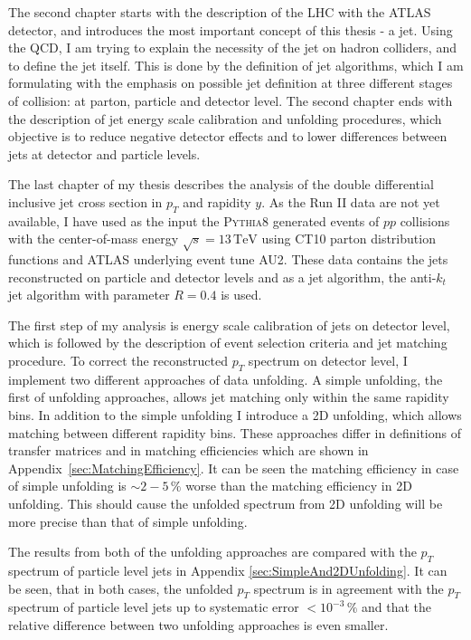 \documentclass[a4paper,11pt,twoside,openright]{book}
\newcommand{\TeV}{\,\text{TeV}}
\newcommand{\pt}{p_{T}}
\begin{document}
The second chapter starts with the description of the LHC with the ATLAS
detector, and introduces the most important concept of this thesis - a jet. Using
the QCD, I am trying to explain the necessity of the jet on hadron colliders,
and to define the jet itself. This is done by the definition of jet algorithms,
which I am formulating with the emphasis on possible jet definition at three
different stages of collision: at parton, particle and detector level. The
second chapter ends with the description of jet energy scale calibration and
unfolding procedures, which objective is to reduce negative detector effects and
to lower differences between jets at detector and particle levels. 

The last chapter of my thesis describes the analysis of the double differential
inclusive jet cross section in $\pt$ and rapidity $y$. As the Run II data are
not yet available, I have used as the input the \textsc{Pythia8} generated
events of $pp$ collisions with the center-of-mass energy $\sqrt{s}=13\TeV$ using
CT10 parton distribution functions and ATLAS underlying event tune AU2. These
data contains the jets reconstructed on particle and detector levels and as a
jet algorithm, the anti-$k_t$ jet algorithm with parameter $R=0.4$ is used.

The first step of my analysis is energy scale calibration of jets on detector
level, which is followed by the description of event selection criteria and jet
matching procedure. To correct the reconstructed $\pt$ spectrum on detector
level, I implement two different approaches of data unfolding. A simple
unfolding, the first of unfolding approaches, allows jet matching only within
the same rapidity bins. In addition to the simple unfolding I introduce a 2D
unfolding, which allows matching between different rapidity bins. These
approaches differ in definitions of transfer matrices and in matching
efficiencies which are shown in Appendix~\ref{sec:MatchingEfficiency}.
It can be seen the matching efficiency in case of simple unfolding is $\sim
2-5\,\%$ worse than the matching efficiency in 2D unfolding. This should cause
the unfolded spectrum from 2D unfolding will be more precise than that of simple
unfolding.

The results from both of the unfolding approaches are compared with the $\pt$
spectrum of particle level jets in Appendix \ref{sec:SimpleAnd2DUnfolding}. It
can be seen, that in both cases, the unfolded $\pt$ spectrum is in agreement
with the $\pt$ spectrum of particle level jets up to systematic error $<
10^{-3}\,\%$ and that the relative difference between two unfolding approaches
is even smaller.
\end{document}
